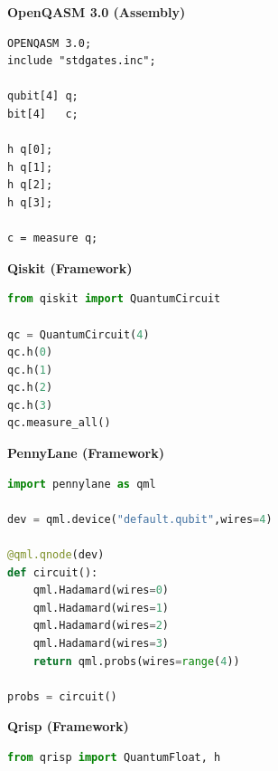 \begin{figure}[htbp]
    \centering
    \begin{minipage}[t]{0.5\textwidth}
        \centering
        \textbf{OpenQASM 3.0 (Assembly)}
        \begin{lstlisting}[basicstyle=\ttfamily\scriptsize,
            frame=single,
            label={lst:lit_rev:qpl:superposition_openqasm}]
OPENQASM 3.0;
include "stdgates.inc";

qubit[4] q;
bit[4]   c;

h q[0];
h q[1];
h q[2];
h q[3];

c = measure q;
        \end{lstlisting}
    \end{minipage}
    \hfill
    \begin{minipage}[t]{0.44\textwidth}
        \centering
        \textbf{Qiskit (Framework)}
        \begin{lstlisting}[basicstyle=\ttfamily\scriptsize,
            language=Python,
            frame=single,
            label={lst:lit_rev:qpl:superposition_qiskit}]
from qiskit import QuantumCircuit

qc = QuantumCircuit(4)
qc.h(0)
qc.h(1)
qc.h(2)
qc.h(3)
qc.measure_all()
        \end{lstlisting}
    \end{minipage}

    \vspace{1em}

    \begin{minipage}[t]{0.5\textwidth}
        \centering
        \textbf{PennyLane (Framework)}
        \begin{lstlisting}[basicstyle=\ttfamily\scriptsize,
            language=Python,
            frame=single,
            label={lst:lit_rev:qpl:superposition_pennylane}]
import pennylane as qml

dev = qml.device("default.qubit",wires=4)

@qml.qnode(dev)
def circuit():
    qml.Hadamard(wires=0)
    qml.Hadamard(wires=1)
    qml.Hadamard(wires=2)
    qml.Hadamard(wires=3)
    return qml.probs(wires=range(4))

probs = circuit()
        \end{lstlisting}
    \end{minipage}
    \hfill
    \begin{minipage}[t]{0.44\textwidth}
        \centering
        \textbf{Qrisp (Framework)}
        \begin{lstlisting}[basicstyle=\ttfamily\scriptsize,
            language=Python,
            frame=single,
            label={lst:lit_rev:qpl:superposition_qrisp}]
from qrisp import QuantumFloat, h


\end{lstlisting}
\end{minipage}
\end{figure}
